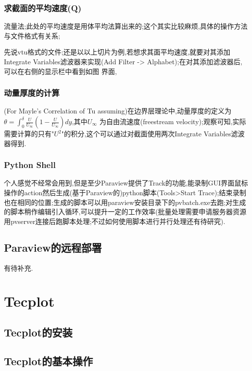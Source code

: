 \subsubsection{求截面的平均速度(Q)}
流量法;此处的平均速度是用体平均法算出来的;这个其实比较麻烦,具体的操作方法与文件格式有关系;\par
先说vtu格式的文件;还是以以上切片为例,若想求其面平均速度,就要对其添加Integrate Variables滤波器来实现(Add Filter -> Alphabet);在对其添加滤波器后,可以在右侧的显示栏中看到如图 界面,


\subsubsection{动量厚度的计算}
(For Mayle's Correlation of Tu assuming)在边界层理论中,动量厚度的定义为$\theta=\int_{0}^{\delta}\frac{U}{U_\infty}(1-\frac{U}{U_\infty})dy$,其中$U_\infty$ 为自由流速度(freestream velocity);观察可知,实际需要计算的只有"$U^2$"的积分,这个可以通过对截面使用两次Integrate Variables滤波器得到.



\subsubsection{Python Shell}
个人感觉不经常会用到,但是至少Paraview提供了Track的功能,能录制GUI界面鼠标操作的action然后生成(基于Paraview的)python脚本(Tools>Start Trace);结束录制也在相同的位置;生成的脚本可以用paraview安装目录下的pvbatch.exe去跑;对生成的脚本稍作编辑引入循环,可以提升一定的工作效率(批量处理需要申请服务器资源用pvserver连接后跑脚本处理;不过如何使用脚本进行并行处理还有待研究).

\subsection{Paraview的远程部署}
有待补充.

\section{Tecplot}

\subsection{Tecplot的安装}

\subsection{Tecplot的基本操作}



